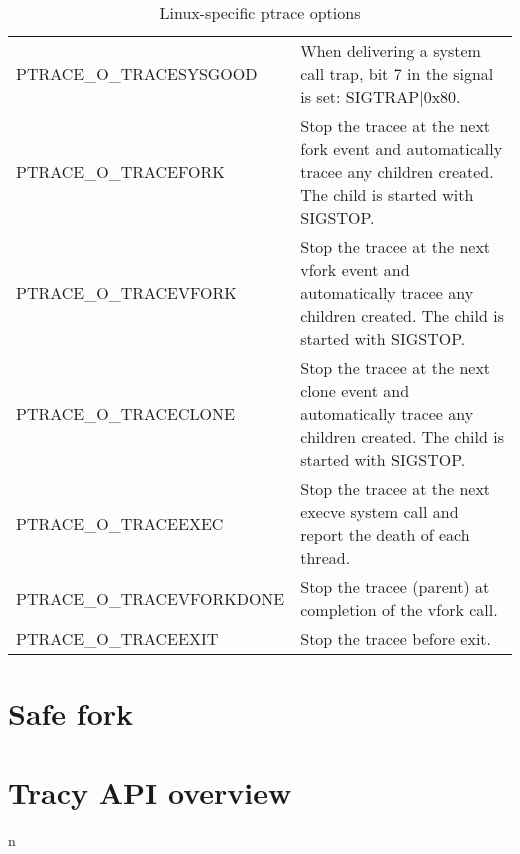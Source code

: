 \documentclass[a4paper, 10pt]{report}
\begin{document}
\begin{table}[h!]
    \centering
    \begin{tabular}{|l|p{8cm}|}
    \hline
        PTRACE\_O\_TRACESYSGOOD & When delivering a system call trap, bit 7 in
    the signal is set: SIGTRAP$|$0x80.\\
        PTRACE\_O\_TRACEFORK & Stop the tracee at the next fork event and
    automatically tracee any children created. The child is started with
    SIGSTOP. \\
        PTRACE\_O\_TRACEVFORK & Stop the tracee at the next vfork event and
    automatically tracee any children created. The child is started with
    SIGSTOP. \\
        PTRACE\_O\_TRACECLONE & Stop the tracee at the next clone event and
    automatically tracee any children created. The child is started with
    SIGSTOP. \\
        PTRACE\_O\_TRACEEXEC & Stop the tracee at the next execve system call
    and report the death of each thread. \\
        PTRACE\_O\_TRACEVFORKDONE & Stop the tracee (parent) at completion
    of the vfork call. \\
        PTRACE\_O\_TRACEEXIT & Stop the tracee before exit. \\
    \hline
    \end{tabular}
    \caption{Linux-specific ptrace options}
    \label{tab:ptrace-opt}
\end{table}


\chapter{Safe fork}
\label{appendix:safefork-asm}

\chapter{Tracy API overview}n
\label{tracy-api}

\end{document}
